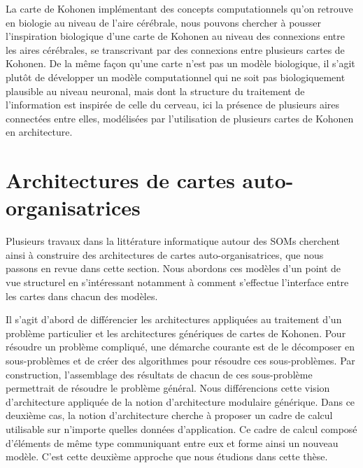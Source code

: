\documentclass[../main]{subfiles}
\begin{document}
La carte de Kohonen implémentant des concepts computationnels qu'on retrouve en biologie au niveau de l'aire cérébrale, nous pouvons chercher à pousser l'inspiration biologique d'une carte de Kohonen au niveau des connexions entre les aires cérébrales, se transcrivant par des connexions entre plusieurs cartes de Kohonen.
De la même façon qu'une carte n'est pas un modèle biologique, il s'agit plutôt de développer un modèle computationnel qui ne soit pas biologiquement plausible au niveau neuronal, mais dont la structure du traitement de l'information est inspirée de celle du cerveau, ici la présence de plusieurs aires connectées entre elles, modélisées par l'utilisation de plusieurs cartes de Kohonen en architecture.

\section{Architectures de cartes auto-organisatrices}

Plusieurs travaux dans la littérature informatique autour des SOMs cherchent ainsi à construire des architectures de cartes auto-organisatrices, que nous passons en revue dans cette section.
Nous abordons ces modèles d'un point de vue structurel en s'intéressant notamment à comment s'effectue l'interface entre les cartes dans chacun des modèles.

Il s'agit d'abord de différencier les architectures appliquées au traitement d'un problème particulier et les architectures génériques de cartes de Kohonen. 
Pour résoudre un problème compliqué, une démarche courante est de le décomposer en sous-problèmes et de créer des algorithmes pour résoudre ces sous-problèmes. Par construction, l'assemblage des résultats de chacun de ces sous-problème permettrait de résoudre le problème général.
Nous différencions cette vision d'architecture appliquée de la notion d'architecture modulaire générique. Dans ce deuxième cas, la notion d'architecture cherche à proposer un cadre de calcul utilisable sur n'importe quelles données d'application. Ce cadre de calcul composé d'éléments de même type communiquant entre eux et forme ainsi un nouveau modèle. C'est cette deuxième approche que nous étudions dans cette thèse. 
\end{document}
